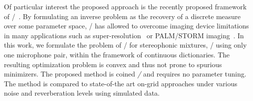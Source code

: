\mynewline
Of particular interest the proposed approach is the recently proposed framework of \CDdef/~.
By formulating an inverse problem as the recovery of a discrete measure over some parameter space, \CD/ has allowed to overcome imaging device limitations in many applications such as super-resolution~ or PALM/STORM imaging~.
In this work, we formulate the problem of \AER/ for stereophonic mixtures, \ie/ using only one microphone pair, within the framework of continuous dictionaries.
The resulting optimization problem is convex and thus not prone to spurious minimizers.
The proposed method is coined \emph{\BLASTERdef/} and requires no parameter tuning.
The method is compared to state-of-the art on-grid approaches under various noise and reverberation levels using simulated data.


